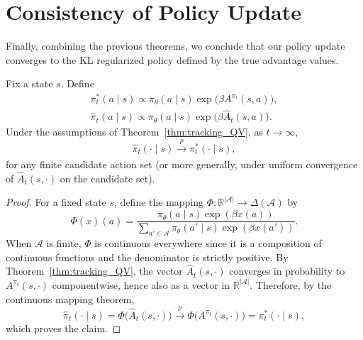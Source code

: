 \section{Consistency of Policy Update} \label{app:cons_policy}

Finally, combining the previous theorems, we conclude that our policy update converges to the KL regularized policy defined by the true advantage values.

\begin{theorem}
\label{cor:policy_consistency}
Fix a state $s$. Define
\begin{align*}
\pi_t^*(a\mid s)\propto \pi_\theta(a\mid s)\exp\!\big(\beta A^{\pi_t}(s,a)\big),\\
\widehat\pi_t(a\mid s)\propto \pi_\theta(a\mid s)\exp\!\big(\beta \widehat A_t(s,a)\big).
\end{align*}
Under the assumptions of Theorem~\ref{thm:tracking_QV},
as $t\to\infty$,
\[
\widehat\pi_t(\cdot\mid s) \xrightarrow[]{p} \pi_t^*(\cdot\mid s),
\]
for any finite candidate action set (or more generally, under uniform convergence of $\widehat A_t(s,\cdot)$ on the candidate set).
\end{theorem}

\begin{proof}
For a fixed state $s$, define the mapping $\Phi:\mathbb{R}^{|\mathcal{A}|}\to\Delta(\mathcal{A})$ by
\[
\Phi(x)(a)
=
\frac{\pi_\theta(a\mid s)\exp(\beta x(a))}
{\sum_{a'\in\mathcal{A}} \pi_\theta(a'\mid s)\exp(\beta x(a'))}.
\]
When $\mathcal{A}$ is finite, $\Phi$ is continuous everywhere since it is a composition of continuous functions and the
denominator is strictly positive. By Theorem~\ref{thm:tracking_QV}, the vector $\widehat A_t(s,\cdot)$ converges in probability
to $A^{\pi_t}(s,\cdot)$ componentwise, hence also as a vector in $\mathbb{R}^{|\mathcal{A}|}$. Therefore, by the continuous
mapping theorem,
\[
\widehat\pi_t(\cdot\mid s)
=
\Phi\!\big(\widehat A_t(s,\cdot)\big)
\xrightarrow{p}
\Phi\!\big(A^{\pi_t}(s,\cdot)\big)
=
\pi_t^*(\cdot\mid s),
\]
which proves the claim.
\end{proof}



